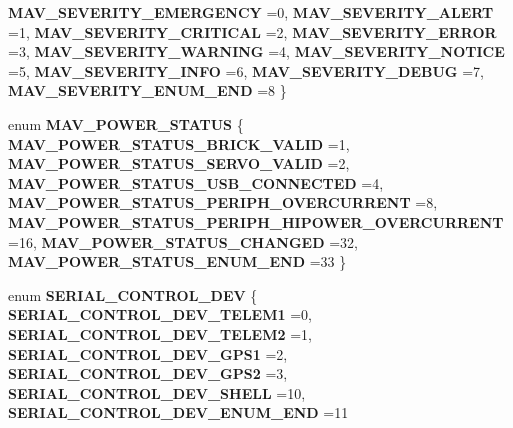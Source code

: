 \begin{DoxyCompactItemize}
\textbf{ M\+A\+V\+\_\+\+S\+E\+V\+E\+R\+I\+T\+Y\+\_\+\+E\+M\+E\+R\+G\+E\+N\+CY} =0, 
\textbf{ M\+A\+V\+\_\+\+S\+E\+V\+E\+R\+I\+T\+Y\+\_\+\+A\+L\+E\+RT} =1, 
\textbf{ M\+A\+V\+\_\+\+S\+E\+V\+E\+R\+I\+T\+Y\+\_\+\+C\+R\+I\+T\+I\+C\+AL} =2, 
\textbf{ M\+A\+V\+\_\+\+S\+E\+V\+E\+R\+I\+T\+Y\+\_\+\+E\+R\+R\+OR} =3, 
\newline
\textbf{ M\+A\+V\+\_\+\+S\+E\+V\+E\+R\+I\+T\+Y\+\_\+\+W\+A\+R\+N\+I\+NG} =4, 
\textbf{ M\+A\+V\+\_\+\+S\+E\+V\+E\+R\+I\+T\+Y\+\_\+\+N\+O\+T\+I\+CE} =5, 
\textbf{ M\+A\+V\+\_\+\+S\+E\+V\+E\+R\+I\+T\+Y\+\_\+\+I\+N\+FO} =6, 
\textbf{ M\+A\+V\+\_\+\+S\+E\+V\+E\+R\+I\+T\+Y\+\_\+\+D\+E\+B\+UG} =7, 
\newline
\textbf{ M\+A\+V\+\_\+\+S\+E\+V\+E\+R\+I\+T\+Y\+\_\+\+E\+N\+U\+M\+\_\+\+E\+ND} =8
 \}
\item 
enum \textbf{ M\+A\+V\+\_\+\+P\+O\+W\+E\+R\+\_\+\+S\+T\+A\+T\+US} \{ \newline
\textbf{ M\+A\+V\+\_\+\+P\+O\+W\+E\+R\+\_\+\+S\+T\+A\+T\+U\+S\+\_\+\+B\+R\+I\+C\+K\+\_\+\+V\+A\+L\+ID} =1, 
\textbf{ M\+A\+V\+\_\+\+P\+O\+W\+E\+R\+\_\+\+S\+T\+A\+T\+U\+S\+\_\+\+S\+E\+R\+V\+O\+\_\+\+V\+A\+L\+ID} =2, 
\textbf{ M\+A\+V\+\_\+\+P\+O\+W\+E\+R\+\_\+\+S\+T\+A\+T\+U\+S\+\_\+\+U\+S\+B\+\_\+\+C\+O\+N\+N\+E\+C\+T\+ED} =4, 
\textbf{ M\+A\+V\+\_\+\+P\+O\+W\+E\+R\+\_\+\+S\+T\+A\+T\+U\+S\+\_\+\+P\+E\+R\+I\+P\+H\+\_\+\+O\+V\+E\+R\+C\+U\+R\+R\+E\+NT} =8, 
\newline
\textbf{ M\+A\+V\+\_\+\+P\+O\+W\+E\+R\+\_\+\+S\+T\+A\+T\+U\+S\+\_\+\+P\+E\+R\+I\+P\+H\+\_\+\+H\+I\+P\+O\+W\+E\+R\+\_\+\+O\+V\+E\+R\+C\+U\+R\+R\+E\+NT} =16, 
\textbf{ M\+A\+V\+\_\+\+P\+O\+W\+E\+R\+\_\+\+S\+T\+A\+T\+U\+S\+\_\+\+C\+H\+A\+N\+G\+ED} =32, 
\textbf{ M\+A\+V\+\_\+\+P\+O\+W\+E\+R\+\_\+\+S\+T\+A\+T\+U\+S\+\_\+\+E\+N\+U\+M\+\_\+\+E\+ND} =33
 \}
\item 
enum \textbf{ S\+E\+R\+I\+A\+L\+\_\+\+C\+O\+N\+T\+R\+O\+L\+\_\+\+D\+EV} \{ \newline
\textbf{ S\+E\+R\+I\+A\+L\+\_\+\+C\+O\+N\+T\+R\+O\+L\+\_\+\+D\+E\+V\+\_\+\+T\+E\+L\+E\+M1} =0, 
\textbf{ S\+E\+R\+I\+A\+L\+\_\+\+C\+O\+N\+T\+R\+O\+L\+\_\+\+D\+E\+V\+\_\+\+T\+E\+L\+E\+M2} =1, 
\textbf{ S\+E\+R\+I\+A\+L\+\_\+\+C\+O\+N\+T\+R\+O\+L\+\_\+\+D\+E\+V\+\_\+\+G\+P\+S1} =2, 
\textbf{ S\+E\+R\+I\+A\+L\+\_\+\+C\+O\+N\+T\+R\+O\+L\+\_\+\+D\+E\+V\+\_\+\+G\+P\+S2} =3, 
\newline
\textbf{ S\+E\+R\+I\+A\+L\+\_\+\+C\+O\+N\+T\+R\+O\+L\+\_\+\+D\+E\+V\+\_\+\+S\+H\+E\+LL} =10, 
\textbf{ S\+E\+R\+I\+A\+L\+\_\+\+C\+O\+N\+T\+R\+O\+L\+\_\+\+D\+E\+V\+\_\+\+E\+N\+U\+M\+\_\+\+E\+ND} =11

\end{DoxyCompactItemize}
